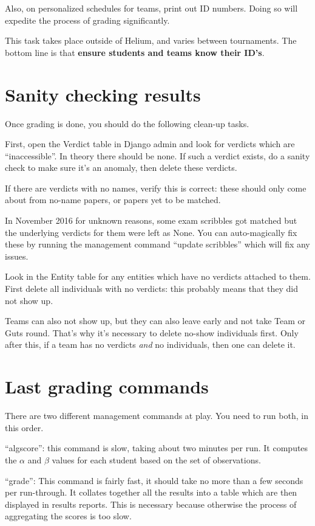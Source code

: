 Also, on personalized schedules for teams, print out ID numbers.
Doing so will expedite the process of grading significantly.

This task takes place outside of Helium, and varies between tournaments.
The bottom line is that \textbf{ensure students and teams know their ID's}.

\section{Sanity checking results}
Once grading is done, you should do the following clean-up tasks.
\begin{itemize}
	\ii First, open the Verdict table in Django admin and look for verdicts which
	are ``inaccessible''.
	In theory there should be none.
	If such a verdict exists, do a sanity check to make sure it's an anomaly,
	then delete these verdicts.

	\ii If there are verdicts with no names, verify this is correct:
	these should only come about from no-name papers,
	or papers yet to be matched.

	In November 2016 for unknown reasons, some exam scribbles got matched
	but the underlying verdicts for them were left as None.
	You can auto-magically fix these by running the
	management command ``update scribbles''
	which will fix any issues.

	\ii Look in the Entity table for any entities which have
	no verdicts attached to them.
	First delete all individuals with no verdicts:
	this probably means that they did not show up.

	Teams can also not show up,
	but they can also leave early and not take Team or Guts round.
	That's why it's necessary to delete no-show individuals first.
	Only after this, if a team has no verdicts \emph{and} no individuals,
	then one can delete it.
\end{itemize}

\section{Last grading commands}
There are two different management commands at play.
You need to run both, in this order.

\begin{itemize} 
	\ii ``algscore'': this command is slow, taking about two minutes per run.
	It computes the $\alpha$ and $\beta$ values for each student
	based on the set of observations.

	\ii ``grade'': This command is fairly fast, it should take no more than
	a few seconds per run-through.
	It collates together all the results into a table which
	are then displayed in results reports.
	This is necessary because otherwise the process of aggregating the scores
	is too slow.
\end{itemize}

